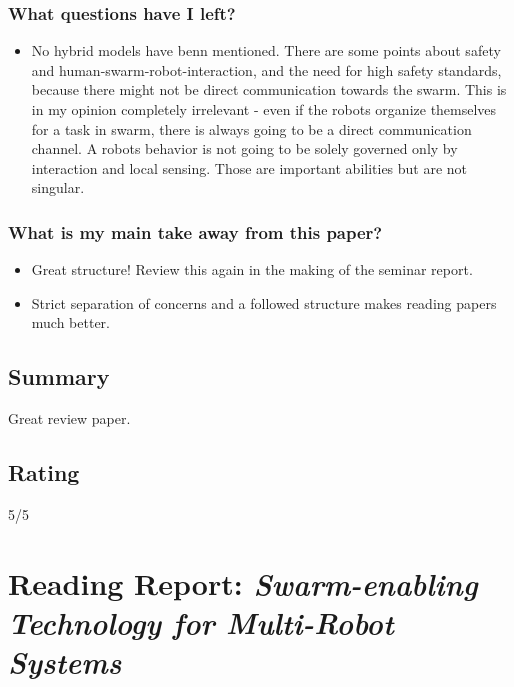 \subsubsection*{What questions have I left?}
\begin{itemize}
    \item No hybrid models have benn mentioned. There are some points about safety and human-swarm-robot-interaction, and the need for high safety standards, because there might not be direct communication towards the swarm. This is in my opinion completely irrelevant - even if the robots organize themselves for a task in swarm, there is always going to be a direct communication channel. A robots behavior is not going to be solely governed only by interaction and local sensing. Those are important abilities but are not singular.    
\end{itemize}
\subsubsection*{What is my main take away from this paper?}
\begin{itemize}
    \item Great structure! Review this again in the making of the seminar report. 
    \item Strict separation of concerns and a followed structure makes reading papers much better.
\end{itemize}

\subsection*{Summary}
Great review paper.

\subsection*{Rating}
5/5


\section{Reading Report: \emph{Swarm-enabling Technology for Multi-Robot Systems}}
\cite{Chamanbaz2017}

